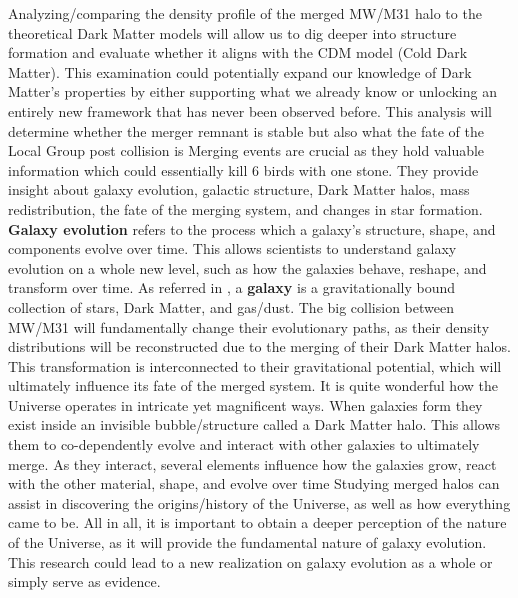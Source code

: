 \documentclass[fleqn,usenatbib]{mnras}
\begin{document}
Analyzing/comparing the density profile of the merged MW/M31 halo to the theoretical Dark Matter models will allow us to dig deeper into structure formation and evaluate whether it aligns with the CDM model (Cold Dark Matter). This examination could potentially expand our knowledge of Dark Matter’s properties by either supporting what we already know or unlocking an entirely new framework that has never been observed before. This analysis will determine whether the merger remnant is stable but also what the fate of the Local Group post collision is \citep{10.1111/j.1365-2966.2010.16912.x} Merging events are crucial as they hold valuable information which could essentially kill 6 birds with one stone. They provide insight about galaxy evolution, galactic structure, Dark Matter halos, mass redistribution, the fate of the merging system, and changes in star formation. \textbf{Galaxy evolution} refers to the process which a galaxy's structure, shape, and components evolve over time. This allows scientists to understand galaxy evolution on a whole new level, such as how the galaxies behave, reshape, and transform over time. As referred in \citep{Willman_2012}, a \textbf{galaxy} is a gravitationally bound collection of stars, Dark Matter, and gas/dust. The big collision between MW/M31 will fundamentally change their evolutionary paths, as their density distributions will be reconstructed due to the merging of their Dark Matter halos. This transformation is interconnected to their gravitational potential, which will ultimately influence its fate of the merged system. It is quite wonderful how the Universe operates in intricate yet magnificent ways. When galaxies form they exist inside an invisible bubble/structure called a Dark Matter halo. This allows them to co-dependently evolve and interact with other galaxies to ultimately merge. As they interact, several elements influence how the galaxies grow, react with the other material, shape, and evolve over time \citep{Frenk_2012} Studying merged halos can assist in discovering the origins/history of the Universe, as well as how everything came to be. All in all, it is important to obtain a deeper perception of the nature of the Universe, as it will provide the fundamental nature of galaxy evolution. This research could lead to a new realization on galaxy evolution as a whole or simply serve as evidence.
\end{document}
